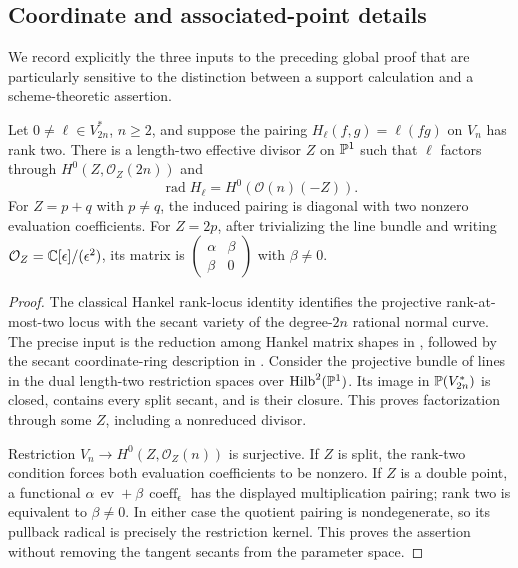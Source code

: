 \subsection{Coordinate and associated-point details}
\label{sec:hyperplane-proof-details}
We record explicitly the three inputs to the preceding global proof
that are particularly sensitive to the distinction between a support
calculation and a scheme-theoretic assertion.

\begin{lemma}
\label{lem:length-two-hankel-precise}
Let $0\ne\ell\in V_{2n}^*$, $n\ge2$, and suppose the pairing
$H_\ell(f,g)=\ell(fg)$ on $V_n$ has rank two. There is a length-two
effective divisor $Z$ on $\mathbb P^1$ such that $\ell$ factors through
$H^0(Z,\mathcal O_Z(2n))$ and
\[
 \operatorname{rad}H_\ell=H^0(\mathcal O(n)(-Z)).
\]
For $Z=p+q$ with $p\ne q$, the induced pairing is diagonal with
two nonzero evaluation coefficients. For $Z=2p$, after trivializing
the line bundle and writing $\mathcal O_Z=\mathbb C[\epsilon]/(\epsilon^2)$,
its matrix is
$\left(\begin{smallmatrix}\alpha&\beta\\\beta&0\end{smallmatrix}\right)$
with $\beta\ne0$.
\end{lemma}
\begin{proof}
The classical Hankel rank-locus identity identifies the projective
rank-at-most-two locus with the secant variety of the degree-$2n$
rational normal curve. The precise input is the reduction among
Hankel matrix shapes in \cite[Section 1, p.~2]{CMSV}, followed by
the secant coordinate-ring description in
\cite[Section 2, p.~3, equation (2.0.1)]{CMSV}.
Consider the projective bundle of lines in the dual length-two
restriction spaces over $\operatorname{Hilb}^2(\mathbb P^1)$.
Its image in $\mathbb P(V_{2n}^*)$ is closed, contains every split secant,
and is their closure. This proves factorization through some $Z$,
including a nonreduced divisor.

Restriction $V_n\to H^0(Z,\mathcal O_Z(n))$ is surjective.
If $Z$ is split, the rank-two condition forces both evaluation
coefficients to be nonzero. If $Z$ is a double point, a functional
$\alpha\,\operatorname{ev}+\beta\,\operatorname{coeff}_{\epsilon}$
has the displayed multiplication pairing; rank two is equivalent
to $\beta\ne0$. In either case the quotient pairing is
nondegenerate, so its pullback radical is precisely the restriction
kernel. This proves the assertion without removing the tangent
secants from the parameter space.
\end{proof}


